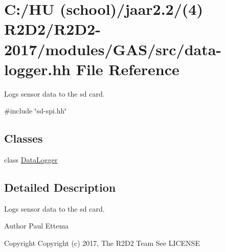 \hypertarget{data-logger_8hh}{}\section{C\+:/\+HU (school)/jaar2.2/(4) R2\+D2/\+R2\+D2-\/2017/modules/\+G\+A\+S/src/data-\/logger.hh File Reference}
\label{data-logger_8hh}


Logs sensor data to the sd card.  


{\ttfamily \#include \char`\"{}sd-\/spi.\+hh\char`\"{}}\newline
\subsection*{Classes}
\begin{DoxyCompactItemize}
\item 
class \hyperlink{class_data_logger}{Data\+Logger}
\end{DoxyCompactItemize}


\subsection{Detailed Description}
Logs sensor data to the sd card. 

\begin{DoxyAuthor}{Author}
Paul Ettema 
\end{DoxyAuthor}
\begin{DoxyCopyright}{Copyright}
Copyright (c) 2017, The R2\+D2 Team  See L\+I\+C\+E\+N\+SE 
\end{DoxyCopyright}
